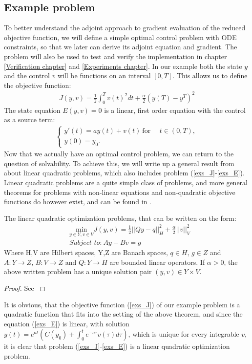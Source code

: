 \subsection{Example problem} \label{example_sec}
To better understand the adjoint approach to gradient evaluation of the reduced objective function, we will define a simple optimal control problem with ODE constraints, so that we later can derive its adjoint equation and gradient. The problem will also be used to test and verify the implementation in chapter \ref{Verification chapter} and \ref{Experiments chapter}. In our example both the state $y$ and the control $v$ will be functions on an interval $[0,T]$. This allows us to define the objective function:
\begin{align}
J(y,v) = \frac{1}{2}\int_0^Tv(t)^2dt + \frac{\alpha}{2}(y(T)-y^T)^2 \label{exs_J}
\end{align}
The state equation $E(y,v)=0$ is a linear, first order equation with the control as a source term:
\begin{align}
\left\{
     \begin{array}{lr}
       	y'(t)=ay(t) + v(t) \ \textrm{for } \quad t\in(0,T),\\
       	y(0)=y_0.
     \end{array}
   \right. \label{exs_E}
\end{align}
Now that we actually have an optimal control problem, we can return to the question of solvability. To achieve this, we will write up a general result from \cite{hinze2008optimization} about linear quadratic problems, which also includes problem (\ref{exs_J}-\ref{exs_E}). Linear quadratic problems are a quite simple class of problems, and more general theorems for problems with non-linear equations and non-quadratic objective functions do however exist, and can be found in \cite{hinze2008optimization}.
\begin{theorem}
The linear quadratic optimization problems, that can be written on the form:
\begin{align*}
&\underset{y\in Y,v\in V}{\text{min}}J(y,v) = \frac{1}{2}||Qy-q||_H^2 + \frac{\alpha}{2}||v||_V^2 \\
&\textit{Subject to:} \ Ay + Bv = g
\end{align*}
Where H,V are Hilbert spaces, Y,Z are Banach spaces, $q\in H$, $g\in Z$ and $A:Y\rightarrow Z$, $B:V\rightarrow Z$ and $Q:Y\rightarrow H$ are bounded linear operators. If $\alpha>0$, the above written problem has a unique solution pair $(y,v)\in Y\times V$.
\end{theorem}   
\begin{proof}
See \cite{hinze2008optimization}
\end{proof}
It is obvious, that the objective function (\ref{exs_J}) of our example problem is a quadratic function that fits into the setting of the above theorem, and since the equation (\ref{exs_E}) is linear, with solution $y(t) = e^{a t}(C(y_0)+\int_0^te^{-a\tau}v(\tau)d\tau)$, which is unique for every integrable $v$, it is clear that problem (\ref{exs_J}-\ref{exs_E}) is a linear quadratic optimization problem. 
